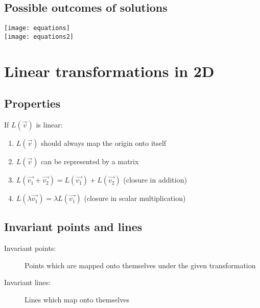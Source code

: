 \subsection{Possible outcomes of solutions}
\texttt{[image: equations]}\\
\texttt{[image: equations2]}

\section{Linear transformations in 2D}
\subsection{Properties}
If $L(\vec{v})$ is linear:
\begin{enumerate}
	\item $L(\vec{v})$ should always map the origin onto itself
	\item $L(\vec{v})$ can be represented by a matrix
	\item $L(\vec{v_1}+\vec{v_2})=L(\vec{v_1})+L(\vec{v_2})$ (closure in addition)
	\item $L(\lambda\vec{v_1})=\lambda L(\vec{v_1})$ (closure in scalar multiplication)
\end{enumerate}
\subsection{Invariant points and lines}
\begin{description}
	\item[Invariant points:] Points which are mapped onto themselves under the given transformation
	\item[Invariant lines:] Lines which map onto themselves
\end{description}


